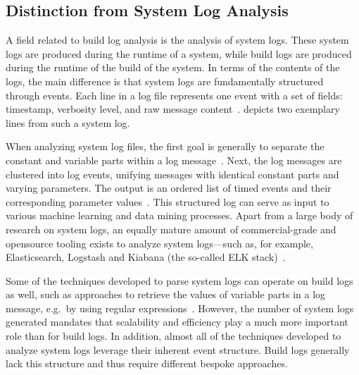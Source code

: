 \subsection{Distinction from System Log Analysis}
\label{sec:system-log-analysis}

A field related to build log analysis is the analysis of system logs.
These system logs are produced during the runtime of a system, while
build logs are produced during the runtime of the build of the system.
In terms of the contents of the logs, the main difference is that system
logs are fundamentally structured
through events.
Each line in a log file represents one event with a
set of fields: timestamp, verbosity level, and raw message
content~\cite{he2017towards}.
 depicts two
exemplary lines from such a system log.

When analyzing system log files, the first goal is generally to
separate the constant and variable parts within a log
message~\cite{nagappan2010abstracting,he2017towards}.  Next, the log
messages are clustered into log events, unifying messages with
identical constant parts and varying parameters.  The output is an
ordered list of timed events and their corresponding parameter
values~\cite{he2016evaluation}.  This structured log can serve as
input to various machine learning and data mining processes. Apart
from a large body of research on system logs, an equally mature amount of commercial-grade and
opensource tooling exists to analyze system logs---such as, for example, Elasticsearch, Logstash and Kiabana (the so-called ELK stack)~\cite{sanjappa2017analysis,bajer2017building}.

Some of the techniques developed to parse system logs can operate
on build logs as well, such as approaches to retrieve the
values of variable parts in a log message, e.g.\, by using regular
expressions~\cite{nagappan2010abstracting,xu2009detecting}.
However, the number of
system logs generated mandates that scalability and efficiency play a
much more important role than for build logs.
In addition, almost all of the techniques developed to analyze system logs
leverage their inherent event structure.   Build logs generally lack this
structure and thus require different bespoke approaches.

